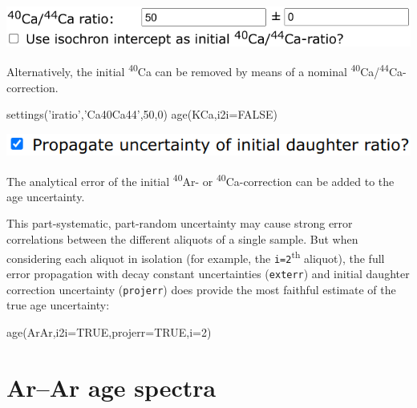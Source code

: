 \begin{refsection}
\noindent\begin{minipage}[t]{.55\linewidth}
\strut\vspace*{-\baselineskip}\newline
\includegraphics[width=\linewidth]{../figures/KCaNominalInitials.png}
\end{minipage}
\begin{minipage}[t]{.45\linewidth}
Alternatively, the initial \textsuperscript{40}Ca can be removed by
means of a nominal
\textsuperscript{40}Ca/\textsuperscript{44}Ca-correction.
\end{minipage}

\begin{script}
settings('iratio','Ca40Ca44',50,0)
age(KCa,i2i=FALSE)
\end{script}

\noindent\begin{minipage}[t]{.5\linewidth}
\strut\vspace*{-\baselineskip}\newline
\includegraphics[width=\linewidth]{../figures/ArArProjerr.png}
\end{minipage}
\begin{minipage}[t]{.5\linewidth}
  The analytical error of the initial \textsuperscript{40}Ar- or
  \textsuperscript{40}Ca-correction can be added to the age
  uncertainty.
\end{minipage}

This part-systematic, part-random uncertainty may cause strong error
correlations between the different aliquots of a single sample. But
when considering each aliquot in isolation (for example, the
\texttt{i=2}\textsuperscript{th} aliquot), the full error propagation
with decay constant uncertainties (\texttt{exterr}) and initial
daughter correction uncertainty (\texttt{projerr}) does provide the
most faithful estimate of the true age uncertainty:

\begin{script}
age(ArAr,i2i=TRUE,projerr=TRUE,i=2)
\end{script}

\section{Ar--Ar age spectra}\label{sec:ArArAgeSpectra}


\end{refsection}
